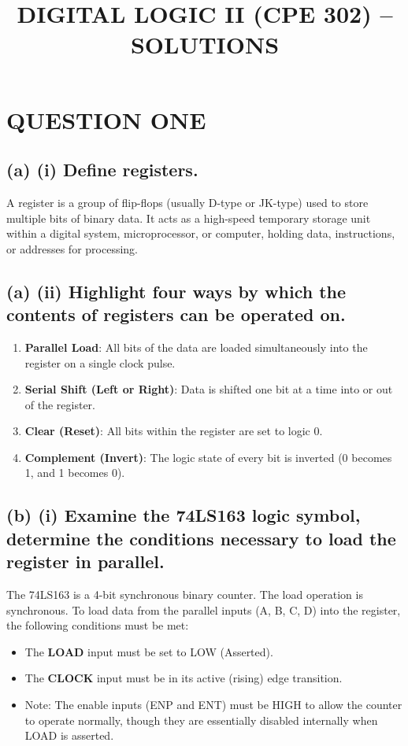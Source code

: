 \documentclass[11pt,a4paper]{article}
\title{\textbf{DIGITAL LOGIC II (CPE 302) – SOLUTIONS}}
\author{}
\date{}
\begin{document}
\maketitle

\section*{QUESTION ONE}

\subsection*{(a) (i) Define registers.}
A register is a group of flip-flops (usually D-type or JK-type) used to store multiple bits of binary data. It acts as a high-speed temporary storage unit within a digital system, microprocessor, or computer, holding data, instructions, or addresses for processing.

\subsection*{(a) (ii) Highlight four ways by which the contents of registers can be operated on.}
\begin{enumerate}
    \item \textbf{Parallel Load}: All bits of the data are loaded simultaneously into the register on a single clock pulse.
    \item \textbf{Serial Shift (Left or Right)}: Data is shifted one bit at a time into or out of the register.
    \item \textbf{Clear (Reset)}: All bits within the register are set to logic 0.
    \item \textbf{Complement (Invert)}: The logic state of every bit is inverted (0 becomes 1, and 1 becomes 0).
\end{enumerate}

\subsection*{(b) (i) Examine the 74LS163 logic symbol, determine the conditions necessary to load the register in parallel.}
The 74LS163 is a 4-bit synchronous binary counter. The load operation is synchronous. To load data from the parallel inputs (A, B, C, D) into the register, the following conditions must be met:

\begin{itemize}
    \item The \textbf{LOAD} input must be set to LOW (Asserted).
    \item The \textbf{CLOCK} input must be in its active (rising) edge transition.
    \item Note: The enable inputs (ENP and ENT) must be HIGH to allow the counter to operate normally, though they are essentially disabled internally when LOAD is asserted.
\end{itemize}
\end{document}
